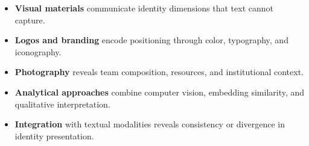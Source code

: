 \begin{summarybox}
\begin{itemize}[leftmargin=*, itemsep=0.3em]
\item \textbf{Visual materials} communicate identity dimensions that text cannot capture.

\item \textbf{Logos and branding} encode positioning through color, typography, and iconography.

\item \textbf{Photography} reveals team composition, resources, and institutional context.

\item \textbf{Analytical approaches} combine computer vision, embedding similarity, and qualitative interpretation.

\item \textbf{Integration} with textual modalities reveals consistency or divergence in identity presentation.
\end{itemize}
\end{summarybox}
